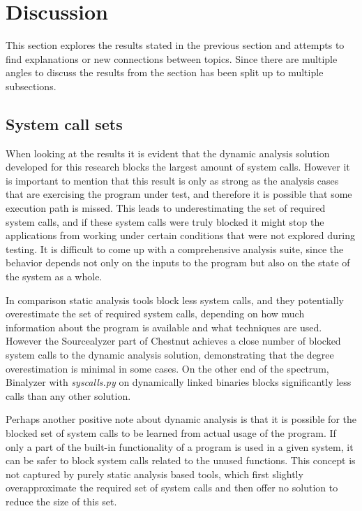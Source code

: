 \section{Discussion}
This section explores the results stated in the previous section and attempts to find explanations or new connections between topics. Since there are multiple angles to discuss the results from the section has been split up to multiple subsections.

\subsection {System call sets}
When looking at the results it is evident that the dynamic analysis solution developed for this research blocks the largest amount of system calls.
However it is important to mention that this result is only as strong as the analysis cases that are exercising the program under test, and therefore it is possible that some execution path is missed.
This leads to underestimating the set of required system calls, and if these system calls were truly blocked it might stop the applications from working under certain conditions that were not explored during testing.
It is difficult to come up with a comprehensive analysis suite, since the behavior depends not only on the inputs to the program but also on the state of the system as a whole.

In comparison static analysis tools block less system calls, and they potentially overestimate the set of required system calls, depending on how much information about the program is available and what techniques are used.
However the Sourcealyzer part of Chestnut achieves a close number of blocked system calls to the dynamic analysis solution, demonstrating that the degree overestimation is minimal in some cases.
On the other end of the spectrum, Binalyzer with \textit{syscalls.py} on dynamically linked binaries blocks significantly less calls than any other solution.

Perhaps another positive note about dynamic analysis is that it is possible for the blocked set of system calls to be learned from actual usage of the program. If only a part of the built-in functionality of a program is used in a given system, it can be safer to block system calls related to the unused functions. This concept is not captured by purely static analysis based tools, which first slightly overapproximate the required set of system calls and then offer no solution to reduce the size of this set.

